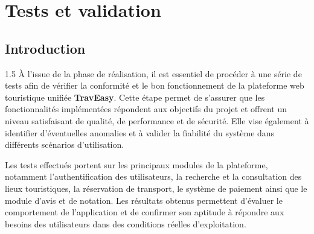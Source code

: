 \documentclass[a4paper,12pt]{report}
\begin{document}
\chapter{ Tests et validation}
\newpage
\section{Introduction}
\vspace{0.5cm}
\begin{spacing}{1.5}
\justifying
À l'issue de la phase de réalisation, il est essentiel de procéder à une série de tests afin de vérifier la conformité et le bon fonctionnement de la plateforme web touristique unifiée \textbf{TravEasy}. Cette étape permet de s'assurer que les fonctionnalités implémentées répondent aux objectifs du projet et offrent un niveau satisfaisant de qualité, de performance et de sécurité. Elle vise également à identifier d'éventuelles anomalies et à valider la fiabilité du système dans différents scénarios d'utilisation.

Les tests effectués portent sur les principaux modules de la plateforme, notamment l'authentification des utilisateurs, la recherche et la consultation des lieux touristiques, la réservation de transport, le système de paiement ainsi que le module d'avis et de notation. Les résultats obtenus permettent d'évaluer le comportement de l'application et de confirmer son aptitude à répondre aux besoins des utilisateurs dans des conditions réelles d'exploitation.


\end{spacing}
\end{document}
